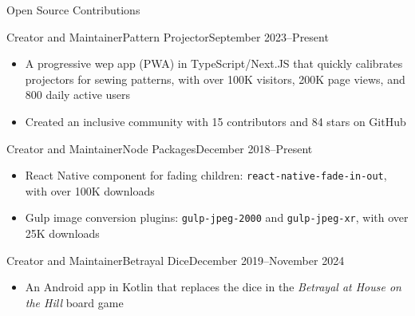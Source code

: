 \documentclass[]{mcdowellcv}
\begin{document}
\begin{cvsection}{Open Source Contributions}
  \begin{cvsubsection}{Creator and Maintainer}{Pattern Projector}{September 2023--Present}
    \begin{itemize}
      \item A progressive wep app (PWA) in TypeScript/Next.JS that quickly calibrates projectors for sewing patterns, with over 100K visitors, 200K page views, and 800 daily active users
      \item Created an inclusive community with 15 contributors and 84 stars on GitHub
    \end{itemize}
  \end{cvsubsection}
  
  \begin{cvsubsection}{Creator and Maintainer}{Node Packages}{December 2018--Present}
    \begin{itemize}
      \item React Native component for fading children: \texttt{react-native-fade-in-out}, with over 100K downloads
      \item Gulp image conversion plugins: \texttt{gulp-jpeg-2000} and \texttt{gulp-jpeg-xr}, with over 25K downloads
    \end{itemize}
  \end{cvsubsection}	

  \begin{cvsubsection}{Creator and Maintainer}{Betrayal Dice}{December 2019--November 2024}
    \begin{itemize}
      \item An Android app in Kotlin that replaces the dice in the \textit{Betrayal at House on the Hill} board game
    \end{itemize}
  \end{cvsubsection}

\end{cvsection}
\end{document}
